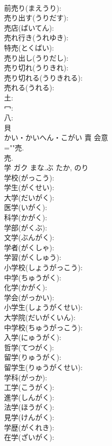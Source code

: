 \documentclass[8pt]{extreport}
\begin{document}
\begin{CJK}{UTF8}{min}
\\	前売り(まえうり): 
\\	売り出す(うりだす): 
\\	売店(ばいてん): 
\\	売れ行き(うれゆき): 
\\	特売(とくばい): 
\\	売り出し(うりだし): 
\\	売り切れ(うりきれ): 
\\	売り切れる(うりきれる): 
\\	売れる(うれる): 
\\	土: 
\\	冖: 
\\	八: 
\\	貝	
\\	かい・かいへん・こがい	賣	会意 
\\	=""売.
\\	売.
\\	学	ガク	まな.ぶ	たか, のり	
\\	学校(がっこう): 
\\	学生(がくせい): 
\\	大学(だいがく): 
\\	医学(いがく): 
\\	科学(かがく): 
\\	学部(がくぶ): 
\\	文学(ぶんがく): 
\\	学者(がくしゃ): 
\\	学習(がくしゅう): 
\\	小学校(しょうがっこう): 
\\	中学(ちゅうがく): 
\\	化学(かがく): 
\\	学会(がっかい): 
\\	小学生(しょうがくせい): 
\\	大学院(だいがくいん): 
\\	中学校(ちゅうがっこう): 
\\	入学(にゅうがく): 
\\	哲学(てつがく): 
\\	留学(りゅうがく): 
\\	留学生(りゅうがくせい): 
\\	学科(がっか): 
\\	工学(こうがく): 
\\	進学(しんがく): 
\\	法学(ほうがく): 
\\	見学(けんがく): 
\\	学歴(がくれき): 
\\	在学(ざいがく): 

\end{CJK}
\end{document}
